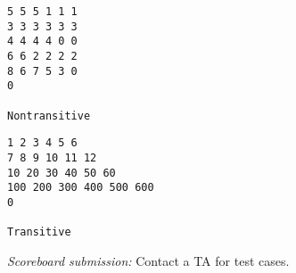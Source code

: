 \documentclass[11pt]{cselabheader}
\theoremstyle{plain}
\begin{document}
\begin{prob}[dice.py]
    \begin{minipage}{.5\linewidth}
      \begin{minipage}{.9\linewidth}
        \begin{lstlisting}[style=bash]
5 5 5 1 1 1
3 3 3 3 3 3
4 4 4 4 0 0
6 6 2 2 2 2
8 6 7 5 3 0
0

Nontransitive
        \end{lstlisting}
      \end{minipage}
    \end{minipage}
    \begin{minipage}{.5\linewidth}
      \begin{minipage}{.9\linewidth}
        \begin{lstlisting}[style=bash]
1 2 3 4 5 6
7 8 9 10 11 12
10 20 30 40 50 60
100 200 300 400 500 600
0

Transitive
        \end{lstlisting}
      \end{minipage}
    \end{minipage}

    \textit{Scoreboard submission:} Contact a TA for test cases.
\end{prob}
\pagebreak
\end{document}
